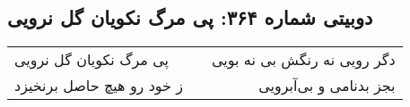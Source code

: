 \begin{center}
\section*{دوبیتی شماره ۳۶۴: پی مرگ نکویان گل نرویی}
\label{sec:364}
\begin{longtable}{l p{0.5cm} r}
پی مرگ نکویان گل نرویی
&&
دگر رویی نه رنگش بی نه بویی
\\
ز خود رو هیچ حاصل برنخیزد
&&
بجز بدنامی و بی‌آبرویی
\\
\end{longtable}
\end{center}
